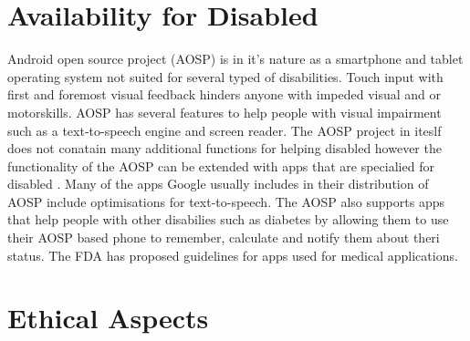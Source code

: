 \documentclass[conference]{IEEEtran}
\begin{document}
\section{Availability for Disabled}
\label{availability}


Android open source project (AOSP) is in it's nature as a smartphone and tablet operating system not suited for several typed of disabilities. Touch input with first and foremost visual feedback hinders anyone with impeded visual and or motorskills. AOSP has several features to help people with visual impairment such as a text-to-speech engine and screen reader\cite{android-disabled-help}. The AOSP project in iteslf does not conatain many additional functions for helping disabled however the functionality of the AOSP can be extended with apps that are specialied for disabled \cite{android-disabled-apps}. Many of the apps Google usually includes in their distribution of AOSP include optimisations for text-to-speech\cite{android-disabled-help}. The AOSP also supports apps that help people with other disabilies such as diabetes\cite{android-disabled-diabetes} by allowing them to use their AOSP based phone to remember, calculate and notify them about theri status. The FDA has proposed guidelines for apps used for medical applications\cite{android-disabled-FDA}.



\section{Ethical Aspects}
\label{ethics}
\end{document}
